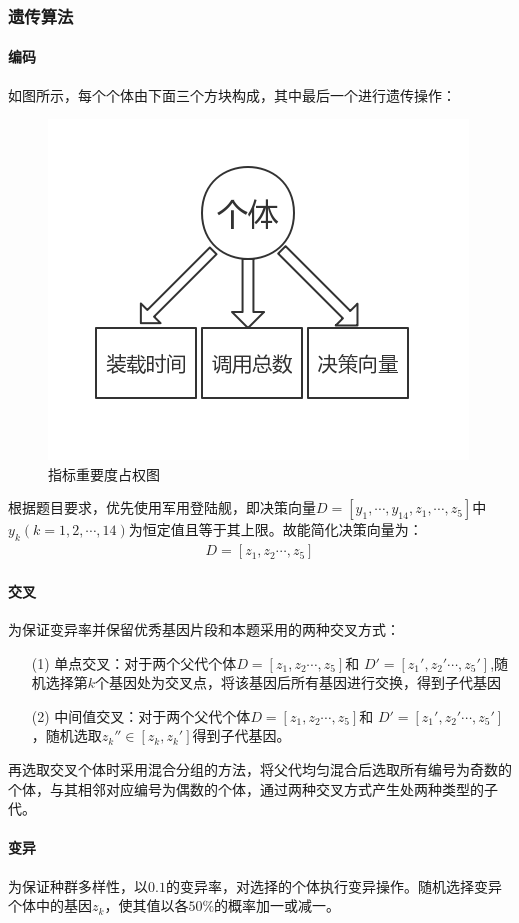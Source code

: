 \documentclass{whutmod}
\begin{document}
	\subsubsection{遗传算法}
	 \paragraph{编码}
	 如图所示，每个个体由下面三个方块构成，其中最后一个进行遗传操作：
	 	\begin{figure}[H]
	 	\centering
	 	\includegraphics[width=.5\textwidth]{figures/yichuan.jpg}
	 	\caption{指标重要度占权图}\label{yichuan}
	 	 \end{figure}
	 根据题目要求，优先使用军用登陆舰，即决策向量$D=[y_{1},\cdots,y_{14},z_{1},\cdots,z_{5}]$中$y_{k}(k=1,2,\cdots,14)$为恒定值且等于其上限。故能简化决策向量为：
	\begin{gather*}
	D=[z_{1},z_{2}\cdots,z_{5}]
	\end{gather*}
	 \paragraph{交叉}
	 为保证变异率并保留优秀基因片段和本题采用的两种交叉方式：
	\begin{itemize}
	\item [(1)]单点交叉：对于两个父代个体$D=[z_{1},z_{2}\cdots,z_{5}]$和	$D'=[z_{1}',z_{2}'\cdots,z_{5}']$,随机选择第$k$个基因处为交叉点，将该基因后所有基因进行交换，得到子代基因
	\item [(2)]中间值交叉：对于两个父代个体$D=[z_{1},z_{2}\cdots,z_{5}]$和	$D'=[z_{1}',z_{2}'\cdots,z_{5}']$，随机选取$z_{k}''\in [z_{k},z_{k}']$得到子代基因。
    \end{itemize}
    再选取交叉个体时采用混合分组的方法，将父代均匀混合后选取所有编号为奇数的个体，与其相邻对应编号为偶数的个体，通过两种交叉方式产生处两种类型的子代。
     \paragraph{变异}
     为保证种群多样性，以$0.1$的变异率，对选择的个体执行变异操作。随机选择变异个体中的基因$z_{k}$，使其值以各$50\%$的概率加一或减一。
\end{document}
